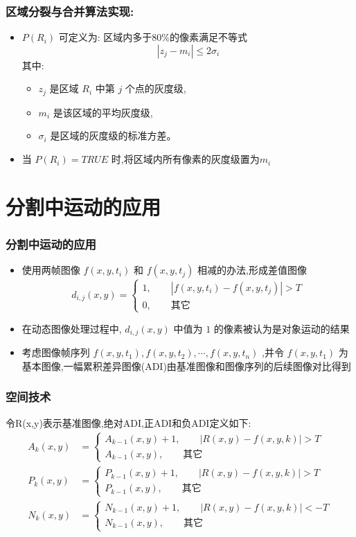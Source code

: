 \documentclass{beamer}
\begin{document}
\begin{frame}
\frametitle{区域分裂与合并算法实现:}
\label{sec-5-5}


\begin{itemize}
\item $P(R_i)$ 可定义为:  区域内多于80\%的像素满足不等式
       \[|z_j-m_i|\leq 2σ_i\]
      其中:
\begin{itemize}
\item $z_j$ 是区域 $R_i$ 中第 $j$ 个点的灰度级,
\item $m_i$ 是该区域的平均灰度级,
\item $σ_i$ 是区域的灰度级的标准方差。
\end{itemize}
\item 当 $P(R_i)=TRUE$ 时,将区域内所有像素的灰度级置为$m_i$
\end{itemize}
\end{frame}
\section{分割中运动的应用}
\label{sec-6}
\begin{frame}
\frametitle{分割中运动的应用}
\label{sec-6-1}


\begin{itemize}
\item 使用两帧图像 $f(x,y,t_i)$ 和 $f(x,y,t_j)$ 相减的办法,形成差值图像
      \[d_{i,j}(x,y)=\begin{cases} 1, \qquad |f(x,y,t_i)-f(x,y,t_j)|>T \\   0,\qquad \text{其它} \end{cases}\]
\item 在动态图像处理过程中, $d_{i,j}(x,y)$ 中值为 $1$ 的像素被认为是对象运动的结果
\item 考虑图像帧序列 $f(x,y,t_1),f(x,y,t_2),\cdots,f(x,y,t_n)$ ,并令 $f(x,y,t_1)$ 为基本图像,一幅累积差异图像(ADI)由基准图像和图像序列的后续图像对比得到
\end{itemize}
\end{frame}
\begin{frame}
\frametitle{空间技术}
\label{sec-6-2}

  令R(x,y)表示基准图像,绝对ADI,正ADI和负ADI定义如下:
\begin{align*}
A_k(x,y)&=\begin{cases} A_{k-1}(x,y)+1, \qquad |R(x,y)-f(x,y,k)|>T \\
                       A_{k-1}(x,y) , \qquad \text{其它}\end{cases}\\
P_k(x,y)&=\begin{cases} P_{k-1}(x,y)+1, \qquad |R(x,y)-f(x,y,k)|>T \\
                       P_{k-1}(x,y) , \qquad \text{其它}\end{cases}\\
N_k(x,y)&=\begin{cases} N_{k-1}(x,y)+1, \qquad |R(x,y)-f(x,y,k)|<-T \\
                       N_{k-1}(x,y) , \qquad \text{其它}\end{cases}
\end{align*}
\end{frame}
\end{document}

